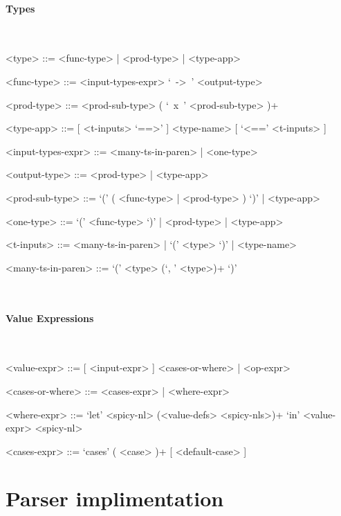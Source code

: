 \documentclass{article}
\begin{document}
\paragraph{Types}

\hspace{1cm}\\
\begin{grammar}

<type> ::= <func-type> | <prod-type> | <type-app>

<func-type> ::= <input-types-expr> `\ ->\ ' <output-type>

<prod-type> ::= <prod-sub-type> ( `\ x\ ' <prod-sub-type> )+

<type-app> ::= [ <t-inputs> `==>' ] <type-name> [ `<==' <t-inputs> ]
 
<input-types-expr> ::= <many-ts-in-paren> | <one-type>

<output-type> ::= <prod-type> | <type-app>

<prod-sub-type> ::= `(' ( <func-type> | <prod-type> ) `)' | <type-app>

<one-type> ::= `(' <func-type> `)' | <prod-type> | <type-app>

<t-inputs> ::= <many-ts-in-paren> | `(' <type> `)' | <type-name>

<many-ts-in-paren> ::=  `(' <type> (`, ' <type>)+ `)'

\end{grammar}


\hspace{1cm}\\

\paragraph{Value Expressions}

\hspace{1cm}\\
\begin{grammar}

<value-expr> ::= [ <input-expr> ] <cases-or-where> | <op-expr>

<cases-or-where> ::= <cases-expr> | <where-expr>

<where-expr> ::=
`let' <spicy-nl> (<value-defs> <spicy-nls>)+ `in' <value-expr> <spicy-nl>

<cases-expr> ::= `cases' ( <case> )+ [ <default-case> ]

\end{grammar}

\section{Parser implimentation}
\end{document}
